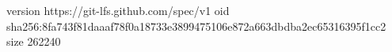 version https://git-lfs.github.com/spec/v1
oid sha256:8fa743f81daaaf78f0a18733e3899475106e872a663dbdba2ec65316395f1cc2
size 262240
